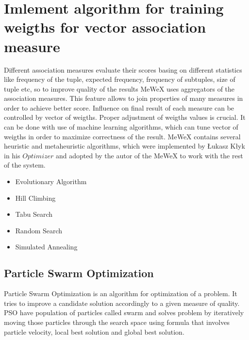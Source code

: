 \chapter{Imlement algorithm for training weigths for vector association measure}\label{vam_descr}

Different association measures evaluate their scores basing on different statistics like frequency of the tuple, 
expected frequency, frequency of subtuples, size of tuple etc, so to improve quality of the results MeWeX uses 
aggregators of the association measures. This feature allows to join properties of many measures in order to achieve 
better score. Influence on final result of each measure can be controlled by vector of weigths. Proper adjustment 
of weigths values is crucial. It can be done with use of machine learning algorithms, which can tune vector of weigths 
in order to maximize correctness of the result. MeWeX contains several heuristic and metaheuristic algorithms, 
which were implemented by Łukasz Kłyk in his \(Optimizer\) and adopted by the autor of the MeWeX to work with the rest of the system.
\begin{itemize}
    \setlength\itemsep{0em}
    \item Evolutionary Algorithm 
    \item Hill Climbing 
    \item Tabu Search 
    \item Random Search 
    \item Simulated Annealing
\end{itemize}

\section{Particle Swarm Optimization}\label{pso_def}

Particle Swarm Optimization is an algorithm for optimization of a problem. It tries to improve a candidate solution 
accordingly to a given measure of quality. PSO have population of particles called swarm and solves problem by iteratively moving those particles 
through the search space using formula that involves particle velocity, local best solution and global best solution. 

